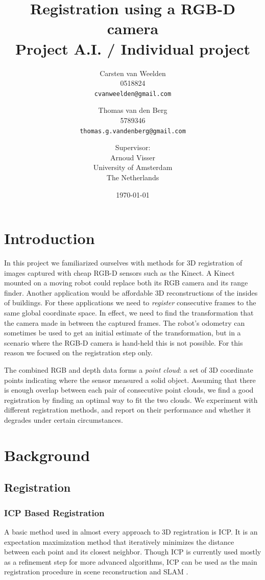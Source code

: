 \documentclass[a4paper]{article}
\title{Registration using a RGB-D camera\\
{\large Project A.I. / Individual project}}
\author{Carsten van Weelden \\ 0518824 \\ \texttt{cvanweelden@gmail.com} \and Thomas van den Berg \\ 5789346 \\ \texttt{thomas.g.vandenberg@gmail.com} \and
 \small{Supervisor:} \\ Arnoud Visser \\ University of Amsterdam\\
  The Netherlands}
\date{\today}
\begin{document}
\maketitle

\section{Introduction}

In this project we familiarized ourselves with methods for 3D registration of images captured with cheap RGB-D sensors such as the Kinect. A Kinect mounted on a moving robot could replace both its RGB camera and its range finder. Another application would be affordable 3D reconstructions of the insides of buildings. For these applications we need to \emph{register} consecutive frames to the same global coordinate space. In effect, we need to find the transformation that the camera made in between the captured frames. The robot's odometry can sometimes be used to get an initial estimate of the transformation, but in a scenario where the RGB-D camera is hand-held this is not possible. For this reason we focused on the registration step only. 

The combined RGB and depth data forms a \emph{point cloud}: a set of 3D coordinate points indicating where the sensor measured a solid object. Assuming that there is enough overlap between each pair of consecutive point clouds, we find a good registration by finding an optimal way to fit the two clouds. We experiment with different registration methods, and report on their performance and whether it degrades under certain circumstances.

\section{Background}

\subsection{Registration}

\subsubsection{ICP Based Registration}

A basic method used in almost every approach to 3D registration is \ac{ICP}\cite{besl1992method}. It is an expectation maximization method that iteratively minimizes the distance between each point and its closest neighbor. Though \ac{ICP} is currently used mostly as a refinement step for more advanced algorithms, \ac{ICP} can be used as the main registration procedure in scene reconstruction \cite{izadi2011kinectfusion,newcombe2011kinectfusion} and \ac{SLAM} \cite{nuchter20076d}.
\end{document}
